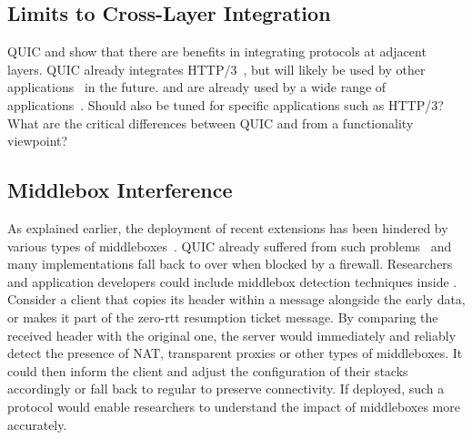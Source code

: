 \subsection{Limits to Cross-Layer Integration}

QUIC and \tcpls show that there are benefits in integrating protocols at
adjacent layers. QUIC already integrates HTTP/3~\cite{draft-ietf-quic-http},
but will likely be used by other
applications~\cite{draft-ietf-dprive-dnsoquic,ssh-quic}
in the future. \tcp and \tls are already used by a wide range of
applications~\cite{anderson2019tls}. Should \tcpls also be tuned
for specific applications such as HTTP/3? What are the critical differences
between QUIC and \tcpls from a functionality viewpoint?









\subsection{Middlebox Interference}

As explained earlier, the deployment of recent \tcp extensions has been
hindered by various types of
middleboxes~\cite{detal2013revealing,medina2004measuring,hesmans2013tcp,edeline2017first}. 
QUIC already suffered from such problems~\cite{langley2017quic}
and many implementations fall back to \tls over \tcp when blocked by a firewall.
Researchers and application developers could include middlebox detection
techniques inside \tcpls. Consider a \tcpls client that copies its \syn header
within a \tcpls message alongside the early data, or makes it part of the
zero-rtt resumption ticket message. By comparing the received \tcp header with
the original one, the server would immediately and reliably detect the presence
of NAT, transparent proxies or other types of middleboxes.  It could then inform
the client and adjust the configuration of their stacks accordingly or fall back
to regular \tcp to preserve connectivity. If deployed, such a protocol would
enable researchers to understand the impact of middleboxes more accurately.

